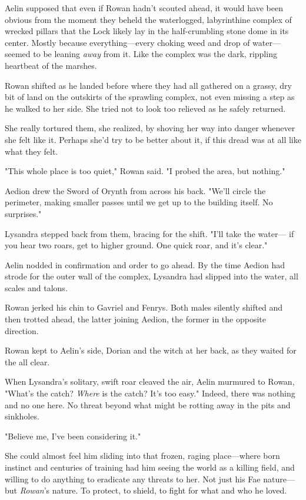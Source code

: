 Aelin supposed that even if Rowan hadn't scouted ahead, it would have been obvious from the moment they beheld the waterlogged, labyrinthine complex of wrecked pillars that the Lock likely lay in the half-crumbling stone dome in its center. Mostly because everything---every choking weed and drop of water--- seemed to be leaning \emph{away} from it. Like the complex was the dark, rippling heartbeat of the marshes.

Rowan shifted as he landed before where they had all gathered on a grassy, dry bit of land on the outskirts of the sprawling complex, not even missing a step as he walked to her side. She tried not to look too relieved as he safely returned.

She really tortured them, she realized, by shoving her way into danger whenever she felt like it. Perhaps she'd try to be better about it, if this dread was at all like what they felt.

"This whole place is too quiet," Rowan said. "I probed the area, but
 nothing."

Aedion drew the Sword of Orynth from across his back. "We'll circle the perimeter, making smaller passes until we get up to the building itself. No surprises."

Lysandra stepped back from them, bracing for the shift. "I'll take the water--- if you hear two roars, get to higher ground. One quick roar, and it's clear."

Aelin nodded in confirmation and order to go ahead. By the time Aedion had strode for the outer wall of the complex, Lysandra had slipped into the water, all scales and talons.

Rowan jerked his chin to Gavriel and Fenrys. Both males silently shifted and then trotted ahead, the latter joining Aedion, the former in the opposite direction.

Rowan kept to Aelin's side, Dorian and the witch at her back, as they waited for the all clear.

When Lysandra's solitary, swift roar cleaved the air, Aelin murmured to Rowan, "What's the catch? \emph{Where} is the catch? It's too easy." Indeed, there was nothing and no one here. No threat beyond what might be rotting away in the pits and sinkholes.

"Believe me, I've been considering it."

She could almost feel him sliding into that frozen, raging place---where born instinct and centuries of training had him seeing the world as a killing field, and willing to do anything to eradicate any threats to her. Not just his Fae nature--- but \emph{Rowan}'s nature. To protect, to shield, to fight for what and who he loved.

